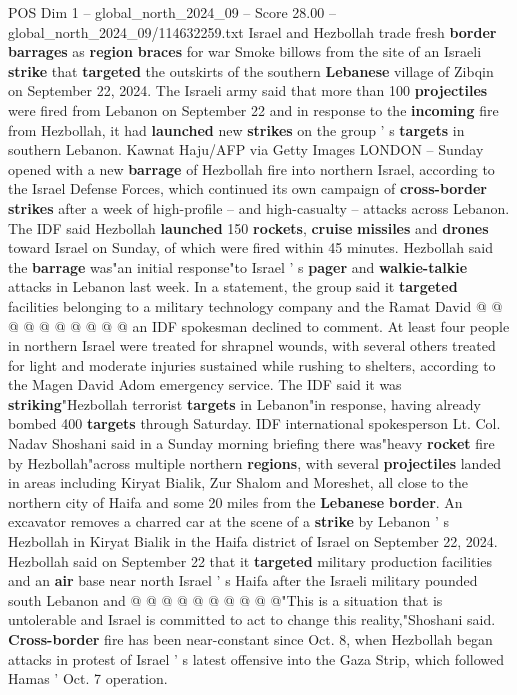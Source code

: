 \begin{textsample}{POS Dim 1 – global\_north\_2024\_09 – Score 28.00 – global\_north\_2024\_09/114632259.txt}  \label{ex:f1_pos_099}
Israel and Hezbollah trade fresh \textbf{border} \textbf{barrages} as \textbf{region} \textbf{braces} for war Smoke billows from the site of an Israeli \textbf{strike} that \textbf{targeted} the outskirts of the southern \textbf{Lebanese} village of Zibqin on September 22, 2024.
The Israeli army said that more than 100 \textbf{projectiles} were fired from Lebanon on September 22 and in response to the \textbf{incoming} fire from Hezbollah, it had \textbf{launched} new \textbf{strikes} on the group ' s \textbf{targets} in southern Lebanon.
Kawnat Haju/AFP via Getty Images LONDON -- Sunday opened with a new \textbf{barrage} of Hezbollah fire into northern Israel, according to the Israel Defense Forces, which continued its own campaign of \textbf{cross-border} \textbf{strikes} after a week of high-profile -- and high-casualty -- attacks across Lebanon.
The IDF said Hezbollah \textbf{launched} 150 \textbf{rockets}, \textbf{cruise} \textbf{missiles} and \textbf{drones} toward Israel on Sunday, of which were fired within 45 minutes.
Hezbollah said the \textbf{barrage} was"an initial response"to Israel ' s \textbf{pager} and \textbf{walkie-talkie} attacks in Lebanon last week.
In a statement, the group said it \textbf{targeted} facilities belonging to a military technology company and the Ramat David @ @ @ @ @ @ @ @ @ @ an IDF spokesman declined to comment.
At least four people in northern Israel were treated for shrapnel wounds, with several others treated for light and moderate injuries sustained while rushing to shelters, according to the Magen David Adom emergency service.
The IDF said it was \textbf{striking}"Hezbollah terrorist \textbf{targets} in Lebanon"in response, having already bombed 400 \textbf{targets} through Saturday.
IDF international spokesperson Lt.
Col.
Nadav Shoshani said in a Sunday morning briefing there was"heavy \textbf{rocket} fire by Hezbollah"across multiple northern \textbf{regions}, with several \textbf{projectiles} landed in areas including Kiryat Bialik, Zur Shalom and Moreshet, all close to the northern city of Haifa and some 20 miles from the \textbf{Lebanese} \textbf{border}.
An excavator removes a charred car at the scene of a \textbf{strike} by Lebanon ' s Hezbollah in Kiryat Bialik in the Haifa district of Israel on September 22, 2024.
Hezbollah said on September 22 that it \textbf{targeted} military production facilities and an \textbf{air} base near north Israel ' s Haifa after the Israeli military pounded south Lebanon and @ @ @ @ @ @ @ @ @ @"This is a situation that is untolerable and Israel is committed to act to change this reality,"Shoshani said. \textbf{Cross-border} fire has been near-constant since Oct. 8, when Hezbollah began attacks in protest of Israel ' s latest offensive into the Gaza Strip, which followed Hamas ' Oct. 7 operation.

\end{textsample}

